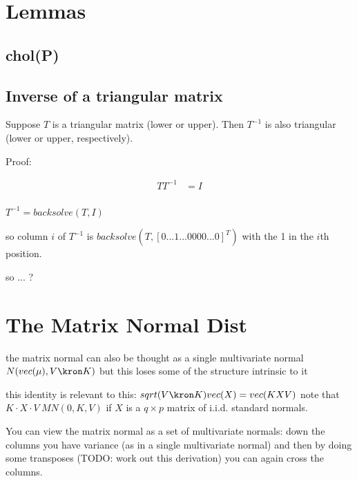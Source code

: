 \documentclass[english]{article}
\begin{document}
\section*{Lemmas}

\subsection*{chol(P)}

\subsection*{Inverse of a triangular matrix}

Suppose $T$ is a triangular matrix (lower or upper). Then $T^{-1}$ is also triangular (lower or upper, respectively).

Proof:


\begin{align*}
T T^{-1} &= I \\
\end{align*}


$T^{-1} = backsolve(T, I)$

so column $i$ of $T^{-1}$ is
 $backsolve(T, [0 ... 1 ... 0 0 0 0 ... 0]^T) $
 with the 1 in the $i$th position.

so ... ?

\section*{The Matrix Normal Dist}


the matrix normal can also be thought as a single multivariate normal $N(vec(\mu), V \kron K)$
but this loses some of the structure intrinsic to it

this identity is relevant to this: $sqrt(V \kron K) vec(X) = vec(K X V)$
note that $K \cdot X \cdot V ~ MN(0, K, V)$ if $X$ is a $q \times p$ matrix of i.i.d. standard normals.

You can view the matrix normal as a set of multivariate normals: down the columns you have variance (as in a single multivariate normal)
 and then by doing some transposes (TODO: work out this derivation) you can again cross the columns.
\end{document}
